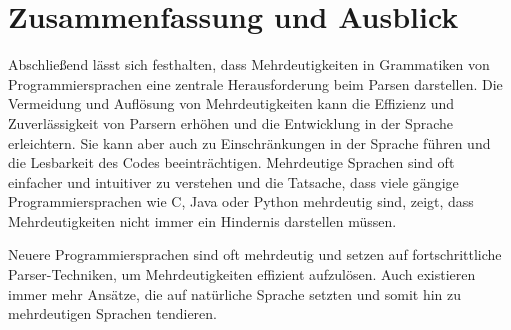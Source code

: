 \documentclass[runningheads]{llncs}
\begin{document}
	\section{Zusammenfassung und Ausblick}

	Abschließend lässt sich festhalten, dass Mehrdeutigkeiten in Grammatiken von Programmiersprachen
	eine zentrale Herausforderung beim Parsen darstellen.
	Die Vermeidung und Auflösung von Mehrdeutigkeiten kann die Effizienz und Zuverlässigkeit von Parsern erhöhen
	und die Entwicklung in der Sprache erleichtern.
	Sie kann aber auch zu Einschränkungen in der Sprache führen und die Lesbarkeit des Codes beeinträchtigen.
	Mehrdeutige Sprachen sind oft einfacher und intuitiver zu verstehen
	und die Tatsache, dass viele gängige Programmiersprachen wie C, Java oder Python mehrdeutig sind,
	zeigt, dass Mehrdeutigkeiten nicht immer ein Hindernis darstellen müssen.

	Neuere Programmiersprachen sind oft mehrdeutig und setzen auf fortschrittliche Parser-Techniken,
	um Mehrdeutigkeiten effizient aufzulösen.
	Auch existieren immer mehr Ansätze, die auf natürliche Sprache setzten
	und somit hin zu mehrdeutigen Sprachen tendieren.
	\cite{watrous2020,springer2013,wharton1976,watrous,parr,kemp1974,qi2018generalized,softwarelanguage,thorup1994}


%
%
%
	
	
\end{document}
